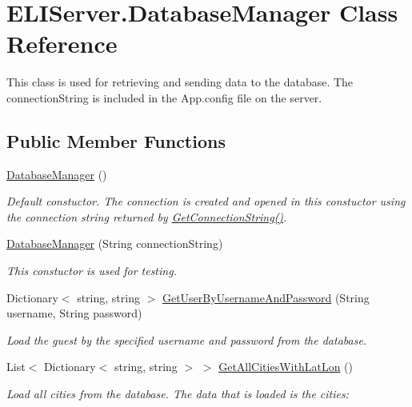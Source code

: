 \hypertarget{class_e_l_i_server_1_1_database_manager}{}\section{E\+L\+I\+Server.\+Database\+Manager Class Reference}
\label{class_e_l_i_server_1_1_database_manager}


This class is used for retrieving and sending data to the database. The connection\+String is included in the App.\+config file on the server.  


\subsection*{Public Member Functions}
\begin{DoxyCompactItemize}
\item 
\hyperlink{class_e_l_i_server_1_1_database_manager_af4932c44cd155cec929be0207f17605e}{Database\+Manager} ()
\begin{DoxyCompactList}\small\item\em Default constuctor. The connection is created and opened in this constuctor using the connection string returned by \hyperlink{class_e_l_i_server_1_1_database_manager_a2a2f09721d3e5ea9db778d74e517e8da}{Get\+Connection\+String()}. \end{DoxyCompactList}\item 
\hyperlink{class_e_l_i_server_1_1_database_manager_a194f6838e3c20bc118069a33a7b3465b}{Database\+Manager} (String connection\+String)
\begin{DoxyCompactList}\small\item\em This constuctor is used for testing. \end{DoxyCompactList}\item 
Dictionary$<$ string, string $>$ \hyperlink{class_e_l_i_server_1_1_database_manager_a5eaf0569ca067ab6e074fc76c03439fe}{Get\+User\+By\+Username\+And\+Password} (String username, String password)
\begin{DoxyCompactList}\small\item\em Load the guest by the specified username and password from the database. \end{DoxyCompactList}\item 
List$<$ Dictionary$<$ string, string $>$ $>$ \hyperlink{class_e_l_i_server_1_1_database_manager_a85c00dfc07b07c4840aca4fcdd09175e}{Get\+All\+Cities\+With\+Lat\+Lon} ()
\begin{DoxyCompactList}\small\item\em Load all cities from the database. The data that is loaded is the cities\+: \end{DoxyCompactList}\item 

\end{DoxyCompactItemize}
